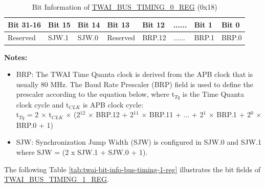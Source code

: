 \documentclass[main\_\_EN.tex]{subfiles}
\begin{document}
\begin{longtable}[c]{|p{2cm}|p{1.5cm}|p{1.5cm}|p{1.5cm}|p{1.5cm}|p{1.5cm}|p{1.5cm}|p{1.5cm}|}
\caption{Bit Information of \hyperref[regdesc:TWAIBUSTIMING0REG]{TWAI\_BUS\_TIMING\_0\_REG} (0x18)}
\label{tab:twai-bit-info-bus-timing-0-reg}\\\hline
\rowcolor{lightgray}
  \textbf{Bit 31-16} & \textbf{Bit 15} & \textbf{Bit 14} & \textbf{Bit 13} & \textbf{Bit 12} & \textbf{......} & \textbf{Bit 1} & \textbf{Bit 0}\\\hline 
  Reserved& SJW.1 & SJW.0 & Reserved & BRP.12 & ...... & BRP.1 & BRP.0\\\hline
\end{longtable}
\vspace{-1.5em}
{\bfseries Notes:}\\
\begin{itemize}
    \item BRP: The TWAI Time Quanta clock is derived from the APB clock that is usually 80 MHz. The Baud Rate Prescaler (BRP) field is used to define the prescaler according to the equation below, where t$_{Tq}$ is the Time Quanta clock cycle and t$_{CLK}$ is APB clock cycle:\\

t$_{Tq}$ = 2 × t$_{CLK}$ × (2$^{12}$ × BRP.12 + 2$^{11}$ × BRP.11 + ... + 2$^1$ × BRP.1 + 2$^0$ × BRP.0 + 1)
    \item SJW: Synchronization Jump Width (SJW) is configured in SJW.0 and SJW.1 where SJW = (2 x SJW.1 + SJW.0 + 1).
\end{itemize}

The following Table \ref{tab:twai-bit-info-bus-timing-1-reg} illustrates the bit fields of \hyperref[regdesc:TWAIBUSTIMING1REG]{TWAI\_BUS\_TIMING\_1\_REG}.
\end{document}
